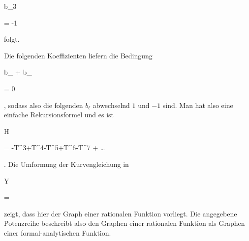 {{\vergleichskette

{b_3
}

{ = }{ -1
}

{  }{
}

{    }{
}

{   }{
}

}
{}{}{}
folgt.


Die folgenden Koeffizienten liefern die Bedingung


\mavergleichskette

{\vergleichskette

{ b_{} + b_{\ell}
}

{ = }{ 0
}

{  }{
}

{    }{
}

{   }{
}

}
{}{}{,}
sodass also die folgenden $b_\ell$ abwechselnd $1$ und $-1$ sind. Man hat also eine einfache Rekursionsformel und es ist


\mavergleichskettedisp

{\vergleichskette

{ H
}

{ =} { -T^3+T^4-T^5+T^6-T^7 + \ldots
}

{ } {
}

{ } {
}

{ } {
}

}
{}{}{.}
Die Umformung der Kurvengleichung in


\mavergleichskettedisp

{\vergleichskette

{ Y
}

{ =} { 
}

{ } {
}

{ } {
}

{ } {
}

}
{}{}{}
zeigt, dass hier der Graph einer rationalen Funktion
 {} {}
vorliegt. Die angegebene Potenzreihe beschreibt also den Graphen einer rationalen Funktion als Graphen einer formal-analytischen Funktion.


}


